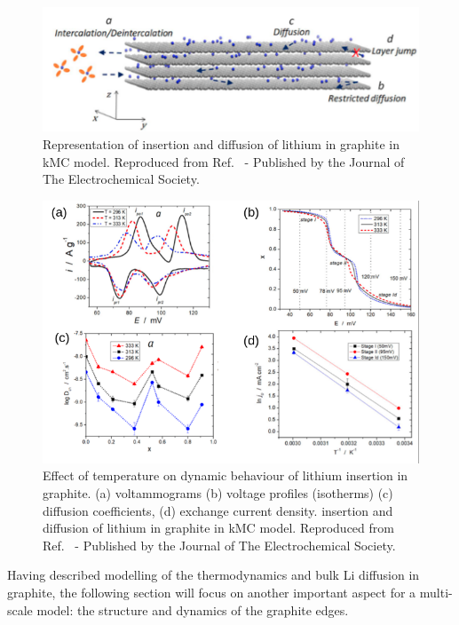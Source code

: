 \documentclass[../main.tex]{subfiles}
\begin{document}
\begin{figure}
    \centering
    \includegraphics[scale=2]{figures/kmc_scheme.png}
    \caption{Representation of insertion and diffusion of lithium in graphite in kMC model. Reproduced from Ref.~ - Published by the Journal of The Electrochemical Society.}
    \label{fig:graphite_kmcscheme}
\end{figure}

\begin{figure}
    \centering
    \includegraphics[scale=2]{figures/kmc_observables.png}
    \caption{Effect of temperature on dynamic behaviour of lithium insertion in graphite. (a) voltammograms (b) voltage profiles (isotherms) (c) diffusion coefficients, (d) exchange current density. insertion and diffusion of lithium in graphite in kMC model. Reproduced from Ref.~ - Published by the Journal of The Electrochemical Society.}
    \label{fig:graphite_kmcobservables}
\end{figure}


Having described modelling of the thermodynamics and bulk Li diffusion in graphite, the following section will focus on another important aspect for a multi-scale model: the structure and dynamics of the graphite edges.
\end{document}
